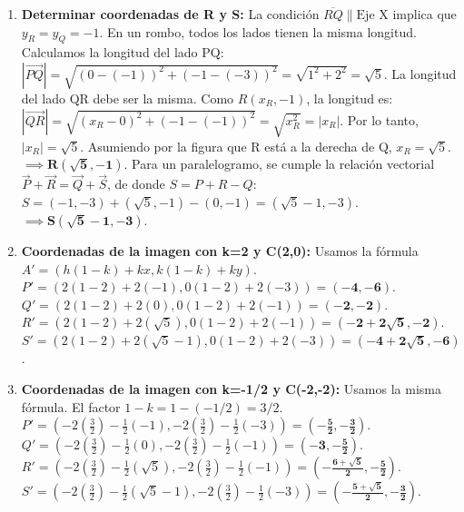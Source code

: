 \documentclass[12pt, letterpaper]{article}
\begin{document}
\begin{enumerate}[label=\alph*)]
    \item \textbf{Determinar coordenadas de R y S:}
    La condición $\overline{RQ} \parallel \text{Eje X}$ implica que $y_R = y_Q = -1$.
    En un rombo, todos los lados tienen la misma longitud. Calculamos la longitud del lado PQ:
    $|\vec{PQ}| = \sqrt{(0 - (-1))^2 + (-1 - (-3))^2} = \sqrt{1^2 + 2^2} = \sqrt{5}$.
    La longitud del lado QR debe ser la misma. Como $R(x_R, -1)$, la longitud es:
    $|\vec{QR}| = \sqrt{(x_R - 0)^2 + (-1 - (-1))^2} = \sqrt{x_R^2} = |x_R|$.
    Por lo tanto, $|x_R| = \sqrt{5}$. Asumiendo por la figura que R está a la derecha de Q, $x_R = \sqrt{5}$.
    $\implies \mathbf{R(\sqrt{5}, -1)}$.
    Para un paralelogramo, se cumple la relación vectorial $\vec{P}+\vec{R} = \vec{Q}+\vec{S}$, de donde $S = P + R - Q$:
    $S = (-1, -3) + (\sqrt{5}, -1) - (0, -1) = (\sqrt{5}-1, -3)$.
    $\implies \mathbf{S(\sqrt{5}-1, -3)}$.

    \item \textbf{Coordenadas de la imagen con k=2 y C(2,0):}
    Usamos la fórmula $A' = (h(1-k)+kx, k(1-k)+ky)$.
    $P' = (2(1-2)+2(-1), 0(1-2)+2(-3)) = \mathbf{(-4, -6)}$.
    $Q' = (2(1-2)+2(0), 0(1-2)+2(-1)) = \mathbf{(-2, -2)}$.
    $R' = (2(1-2)+2(\sqrt{5}), 0(1-2)+2(-1)) = \mathbf{(-2+2\sqrt{5}, -2)}$.
    $S' = (2(1-2)+2(\sqrt{5}-1), 0(1-2)+2(-3)) = \mathbf{(-4+2\sqrt{5}, -6)}$.

    \item \textbf{Coordenadas de la imagen con k=-1/2 y C(-2,-2):}
    Usamos la misma fórmula. El factor $1-k = 1 - (-1/2) = 3/2$.
    $P' = (-2(\frac{3}{2}) - \frac{1}{2}(-1), -2(\frac{3}{2}) - \frac{1}{2}(-3)) = \mathbf{(-\frac{5}{2}, -\frac{3}{2})}$.
    $Q' = (-2(\frac{3}{2}) - \frac{1}{2}(0), -2(\frac{3}{2}) - \frac{1}{2}(-1)) = \mathbf{(-3, -\frac{5}{2})}$.
    $R' = (-2(\frac{3}{2}) - \frac{1}{2}(\sqrt{5}), -2(\frac{3}{2}) - \frac{1}{2}(-1)) = \mathbf{(-\frac{6+\sqrt{5}}{2}, -\frac{5}{2})}$.
    $S' = (-2(\frac{3}{2}) - \frac{1}{2}(\sqrt{5}-1), -2(\frac{3}{2}) - \frac{1}{2}(-3)) = \mathbf{(-\frac{5+\sqrt{5}}{2}, -\frac{3}{2})}$.
\end{enumerate}
\end{document}

